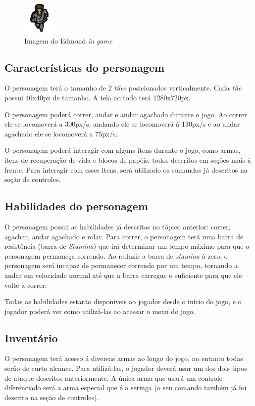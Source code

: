 \documentclass{article}
\begin{document}
\begin{figure}[h]
    \centering
    \caption{Imagem do Edmond \textit{in game}}
     \includegraphics[keepaspectratio=true,scale=4]{images/e_ig.png}
\end{figure}
\subsection{Características do personagem}
O personagem terá o tamanho de 2 \textit{tiles} posicionados verticalmente. Cada \textit{tile} possui 40x40px de tamanho. A tela ao todo terá 1280x720px. 

O personagem poderá correr, andar e andar agachado durante o jogo. Ao correr ele se locomoverá a 300px/s, andando ele se locomoverá à 130px/s e ao andar agachado ele se locomoverá a 75px/s.

O personagem poderá interagir com alguns itens durante o jogo, como armas, itens de recuperação de vida e blocos de papéis, todos descritos em seções mais à frente. Para interagir com esses itens, será utilizado os comandos já descritos na seção de controles.

\subsection{Habilidades do personagem}
O personagem possui as habilidades já descritas no tópico anterior: correr, agachar, andar agachado e rolar. Para correr, o personagem terá uma barra de resistência (barra de \textit{Stamina}) que irá determinar um tempo máximo para que o personagem permaneça correndo. Ao reduzir a barra de \textit{stamina} à zero, o personagem será incapaz de permanecer correndo por um tempo, tornando a andar em velocidade normal até que a barra carregue o suficiente para que ele volte a correr.

Todas as habilidades estarão disponíveis ao jogador desde o início do jogo, e o jogador poderá ver como utilizá-las ao acessar  o menu do jogo.

\subsection{Inventário}
O personagem terá acesso á diversas armas ao longo do jogo, no entanto todas serão de curto alcance. Para utilizá-las, o jogador deverá usar um dos dois tipos de ataque descritos anteriormente. A única arma que usará um controle diferenciado será a arma especial que é a seringa (o seu comando também já foi descrito na seção de controles). 
\end{document}
